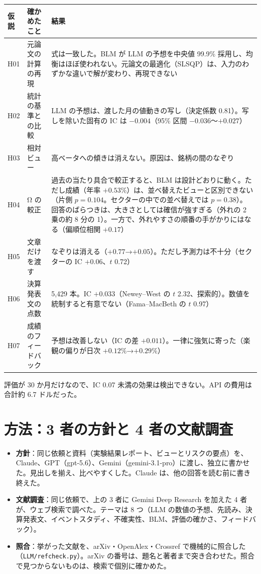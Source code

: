 \documentclass[xelatex,ja=standard,jafont=haranoaji,a4paper,10pt]{bxjsarticle}
\newcommand{\code}[1]{\texttt{#1}}
\begin{document}
\begin{center}\small
\begin{tabularx}{\linewidth}{@{}l p{30mm} L@{}}
\toprule
仮説 & 確かめたこと & 結果 \\
\midrule
H01 & 元論文の計算の再現 & 式は一致した。BLM が LLM の予想を中央値 99.9\% 採用し、均衡はほぼ使われない。元論文の最適化（SLSQP）は、入力のわずかな違いで解が変わり、再現できない \\
H02 & 統計の基準との比較 & LLM の予想は、渡した月の値動きの写し（決定係数 0.81）。写しを除いた固有の IC は $-0.004$（95\% 区間 $-0.036$〜$+0.027$） \\
H03 & 相対ビュー & 高ベータへの傾きは消えない。原因は、銘柄の間のなぞり \\
H04 & Ω の較正 & 過去の当たり具合で較正すると、BLM は設計どおりに動く。ただし成績（年率 $+0.53\%$）は、並べ替えたビューと区別できない（片側 $p=0.104$。セクターの中での並べ替えでは $p=0.38$）。回答のばらつきは、大きさとしては確信が強すぎる（外れの 2 乗の約 8 分の 1）。一方で、外れやすさの順番の手がかりにはなる（偏順位相関 $+0.17$） \\
H05 & 文章だけを渡す & なぞりは消える（$+0.77$→$+0.05$）。ただし予測力は不十分（セクターの IC $+0.06$、$t$ 0.72） \\
H06 & 決算発表文の点数 & 5,429 本。IC $+0.033$（Newey--West の $t$ 2.32、探索的）。数値を統制すると有意でない（Fama--MacBeth の $t$ 0.97） \\
H07 & 成績のフィードバック & 予想は改善しない（IC の差 $+0.011$）。一律に強気に寄った（楽観の偏りが日次 $+0.12\%$→$+0.29\%$） \\
\bottomrule
\end{tabularx}
\end{center}

評価が 30 か月だけなので、IC 0.07 未満の効果は検出できない。API の費用は合計約 6.7 ドルだった。

\section{方法：3 者の方針と 4 者の文献調査}

\begin{itemize}
\item \textbf{方針}：同じ依頼と資料（実験結果レポート、ビューとリスクの要点）を、Claude、GPT（gpt-5.6）、Gemini（gemini-3.1-pro）に渡し、独立に書かせた。見出しを揃え、比べやすくした。Claude は、他の回答を読む前に書き終えた。
\item \textbf{文献調査}：同じ依頼で、上の 3 者に Gemini Deep Research を加えた 4 者が、ウェブ検索で調べた。テーマは 8 つ（LLM の数値の予想、先読み、決算発表文、イベントスタディ、不確実性、BLM、評価の確かさ、フィードバック）。
\item \textbf{照合}：挙がった文献を、arXiv・OpenAlex・Crossref で機械的に照合した（\code{LLM/refcheck.py}）。arXiv の番号は、題名と著者まで突き合わせた。照合で見つからないものは、検索で個別に確かめた。
\end{itemize}
\end{document}
